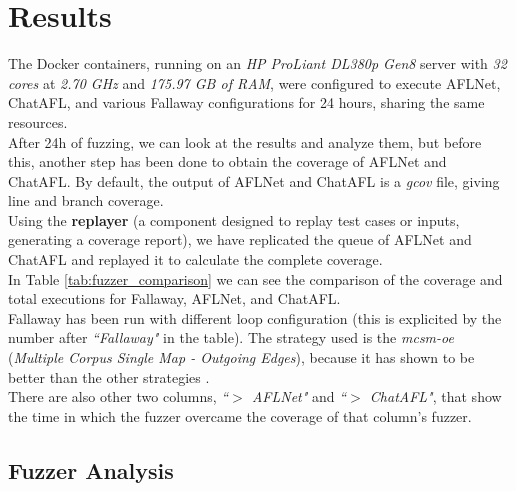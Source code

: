 \chapter{Results}
\label{chap:Results}
The Docker containers, running on an \textit{HP ProLiant DL380p Gen8} server with \textit{32 cores} at \textit{2.70 GHz} and \textit{175.97 GB of RAM}, were configured to execute AFLNet, ChatAFL, and various Fallaway configurations for 24 hours, sharing the same resources.
\\After 24h of fuzzing, we can look at the results and analyze them, but before this, another step has been done to obtain the coverage of AFLNet and ChatAFL. By default, the output of AFLNet and ChatAFL is a \textit{gcov} file, giving line and branch coverage.
\\Using the \textbf{replayer} (a component designed to replay test cases or inputs, generating a coverage report), we have replicated the queue of AFLNet and ChatAFL and replayed it to calculate the complete coverage.
\\In Table \ref{tab:fuzzer_comparison} we can see the comparison of the coverage and total executions for Fallaway, AFLNet, and ChatAFL. 
\\Fallaway has been run with different loop configuration (this is explicited by the number after \textit{``Fallaway"} in the table). The strategy used is the \textit{mcsm-oe} (\textit{Multiple Corpus Single Map - Outgoing Edges}), because it has shown to be better than the other strategies \cite{Fallaway}.
\\There are also other two columns, \textit{``$>$ AFLNet"} and \textit{``$>$ ChatAFL"}, that show the time in which the fuzzer overcame the coverage of that column's fuzzer.

\section{Fuzzer Analysis}

